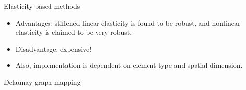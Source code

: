 \documentclass[t,12pt]{beamer}
\begin{document}
\begin{frame}{Elasticity-based methods}
\begin{itemize}
	\item Advantages: stiffened linear elasticity is found to be robust, and nonlinear elasticity is claimed to be very robust.
	\item Disadvantage: expensive!
	\item Also, implementation is dependent on element type and spatial dimension.
\end{itemize}
\end{frame}

\begin{frame}{Delaunay graph mapping}
 \begin{figure}
 	\centering
\end{figure}
\end{frame}
\end{document}
